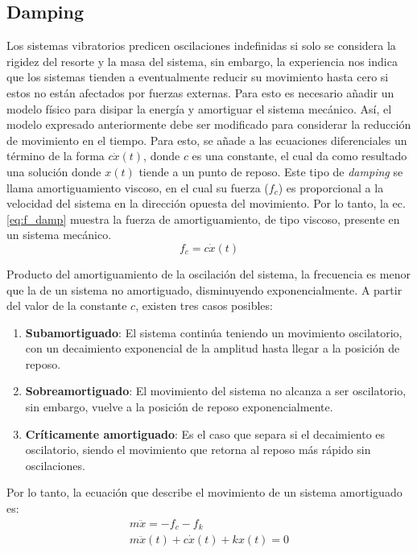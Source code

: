 \subsection{Damping}
\label{sec:damping}
Los sistemas vibratorios predicen oscilaciones indefinidas si solo se considera la rigidez del resorte y la masa del sistema, sin embargo, la experiencia nos indica que los sistemas tienden a eventualmente reducir su movimiento hasta cero si estos no están afectados por fuerzas externas. Para esto es necesario añadir un modelo físico para disipar la energía y amortiguar el sistema mecánico. Así, el modelo expresado anteriormente debe ser modificado para considerar la reducción de movimiento en el tiempo. Para esto, se añade a las ecuaciones diferenciales un término de la forma $c\dot{x}(t)$, donde $c$ es una constante, el cual da como resultado una solución donde $x(t)$ tiende a un punto de reposo. Este tipo de \textit{damping} se llama amortiguamiento viscoso, en el cual su fuerza ($f_c$) es proporcional a la velocidad del sistema en la dirección opuesta del movimiento. Por lo tanto, la ec. \ref{eq:f_damp} muestra la fuerza de amortiguamiento, de tipo viscoso, presente en un sistema mecánico.
\begin{equation}\label{eq:f_damp}
	f_c = c\dot{x}(t)
\end{equation}

Producto del amortiguamiento de la oscilación del sistema, la frecuencia es menor que la de un sistema no amortiguado, disminuyendo exponencialmente. A partir del valor de la constante $c$, existen tres casos posibles:
\begin{enumerate}
	\item \textbf{Subamortiguado}: El sistema continúa teniendo un movimiento oscilatorio, con un decaimiento exponencial de la amplitud hasta llegar a la posición de reposo.
	\item \textbf{Sobreamortiguado}: El movimiento del sistema no alcanza a ser oscilatorio, sin embargo, vuelve a la posición de reposo exponencialmente.
	\item \textbf{Críticamente amortiguado}: Es el caso que separa si el decaimiento es oscilatorio, siendo el movimiento que retorna al reposo más rápido sin oscilaciones.
\end{enumerate}

Por lo tanto, la ecuación que describe el movimiento de un sistema amortiguado es:
\begin{gather*}
	m\ddot{x} = -f_c - f_k \\
	m\ddot{x}(t) + c\dot{x}(t) + kx(t) = 0 
\end{gather*}

